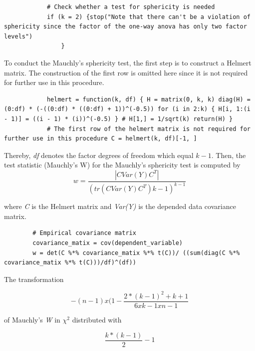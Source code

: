 \documentclass[11pt]{article}
\begin{document}
		\begin{lstlisting}
			# Check whether a test for sphericity is needed 
			if (k = 2) {stop("Note that there can't be a violation of sphericity since the factor of the one-way anova has only two factor levels") 
				}
		\end{lstlisting}
		
		To conduct the Mauchly's sphericity test, the first step is to construct a Helmert matrix. The construction of the first row is omitted here since it is not required for further use in this procedure.\\
		
		\begin{lstlisting}
			helmert = function(k, df) { H = matrix(0, k, k) diag(H) = (0:df) * (-((0:df) * ((0:df) + 1))^(-0.5)) for (i in 2:k) { H[i, 1:(i - 1)] = ((i - 1) * (i))^(-0.5) } # H[1,] = 1/sqrt(k) return(H) }
			# The first row of the helmert matrix is not required for further use in this procedure C = helmert(k, df)[-1, ]
		\end{lstlisting}
		
		Thereby, \textit{df} denotes the factor degrees of freedom which equal $k - 1$. Then, the test statistic (Mauchly's W) for the Mauchly's sphericity test is computed by\\
		
		\begin{equation}
		w = \frac{|CVar(Y)C^T|}{(tr(C Var(Y)C^T)k-1)^{k-1}}
		\end{equation}
			
		where \textit{C} is the Helmert matrix and \textit{Var(Y)} is the depended data covariance matrix.\\
		
		\begin{lstlisting}
		# Empirical covariance matrix 
		covariance_matix = cov(dependent_variable)
		w = det(C %*% covariance_matix %*% t(C))/ ((sum(diag(C %*% covariance_matix %*% t(C)))/df)^(df))
		\end{lstlisting}
		
		The transformation 
		
		\begin{equation}
			-(n-1)x(1-\frac{2*(k-1)^2+k+1}{6 x k-1 x n-1}
		\end{equation}
		
		of Mauchly's \textit{W} in $\chi^2$ distributed with
		
		\begin{equation}
			\frac{k*(k-1)}{2}-1
		\end{equation}
		
\end{document}
